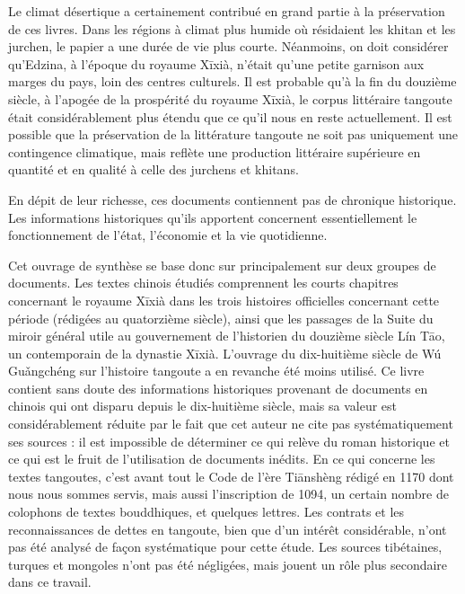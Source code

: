\documentclass[oldfontcommands,oneside,a4paper,11pt]{memoir}
\newcommand{\ipa}[1]{{\phon #1}} %
\newcommand{\ah}{\v{a}}
\begin{document}
Le climat désertique a certainement contribué en grand partie à la préservation de ces livres. Dans les régions à climat plus humide où résidaient les khitan et les jurchen, le papier a une durée de vie plus courte. Néanmoins, on doit considérer qu'Edzina, à l'époque du royaume Xīxià, n'était qu'une petite garnison aux marges du pays, loin des centres culturels. Il est probable qu'à la fin du douzième siècle, à l'apogée de la prospérité du royaume Xīxià, le corpus littéraire tangoute était considérablement plus étendu que ce qu'il nous en reste actuellement. Il est possible que la préservation de la littérature tangoute ne soit pas uniquement une contingence climatique, mais reflète une production littéraire supérieure en quantité et en qualité à celle des jurchens et khitans.


En dépit de leur richesse, ces documents contiennent pas de chronique historique. Les informations historiques qu'ils apportent concernent essentiellement le fonctionnement de l'état, l'économie et la vie quotidienne. 

Cet ouvrage de synthèse se base donc sur principalement sur deux groupes de documents. Les textes chinois étudiés comprennent les courts chapitres concernant le royaume Xīxià dans les trois histoires officielles concernant cette période (rédigées au quatorzième siècle), ainsi que les passages de la \ipa{Suite du miroir général utile au gouvernement} de l'historien du douzième siècle Lín Tāo, un contemporain de la dynastie Xīxià. L'ouvrage du dix-huitième siècle de Wú Gu\ah{}ngchéng sur l'histoire tangoute a en revanche été moins utilisé. Ce livre contient sans doute des informations historiques provenant de documents en chinois qui ont disparu depuis le dix-huitième siècle, mais sa valeur est considérablement réduite par le fait que cet auteur ne cite pas systématiquement ses sources : il est impossible de déterminer ce qui relève du roman historique et ce qui est le fruit de l'utilisation de documents inédits. En ce qui concerne les textes tangoutes, c'est avant tout le \ipa{Code de l'ère Tiānshèng} rédigé en 1170 dont nous nous sommes servis, mais aussi l'inscription de 1094, un certain nombre de colophons de textes bouddhiques, et quelques lettres. Les contrats et les reconnaissances de dettes en tangoute, bien que d'un intérêt considérable, n'ont pas été analysé de façon systématique pour cette étude. Les sources tibétaines, turques et mongoles n'ont pas été négligées, mais jouent un rôle plus secondaire dans ce travail.
\end{document}

